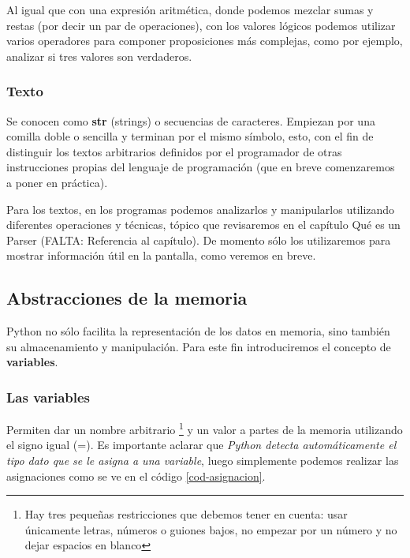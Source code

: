 Al igual que con una expresión aritmética, donde podemos mezclar sumas y restas (por decir un par de operaciones), con los valores lógicos podemos utilizar varios operadores para componer proposiciones más complejas, como por ejemplo, analizar si tres valores son verdaderos.

\subsubsection{Texto} 

Se conocen como \textbf{str} (strings) o secuencias de caracteres. Empiezan por una comilla doble o sencilla y terminan por el mismo símbolo, esto, con el fin de distinguir los textos arbitrarios definidos por el programador de otras instrucciones propias del lenguaje de programación (que en breve comenzaremos a poner en práctica).

Para los textos, en los programas podemos analizarlos y manipularlos utilizando diferentes operaciones y técnicas, tópico que revisaremos en el capítulo Qué es un Parser (FALTA: Referencia al capítulo). De momento sólo los utilizaremos para mostrar información útil en la pantalla, como veremos en breve.

\subsection{Abstracciones de la memoria}

Python no sólo facilita la representación de los datos en memoria, sino también su almacenamiento y manipulación. Para este fin introduciremos el concepto de \textbf{variables}.

\subsubsection{Las variables}

Permiten dar un nombre arbitrario \footnote{Hay tres pequeñas restricciones que debemos tener en cuenta: usar únicamente letras, números o guiones bajos, no empezar por un número y no dejar espacios en blanco} y un valor a partes de la memoria utilizando el signo igual (=). Es importante aclarar que \emph{Python detecta automáticamente el tipo dato que se le asigna a una variable}, luego simplemente podemos realizar las asignaciones como se ve en el código \ref{cod-asignacion}. \\



